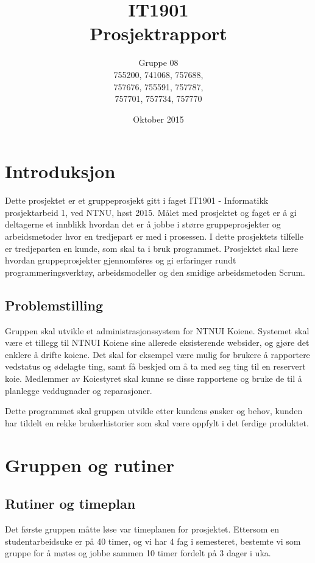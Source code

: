 \documentclass[12pt,a4paper,norsk]{article}
\title{IT1901 \\ Prosjektrapport}
\author{Gruppe 08 \\ 
    755200, 741068, 757688,\\
    757676, 755591, 757787, \\
    757701, 757734, 757770}
\date{Oktober 2015}
\begin{document}
	\maketitle
	\newpage
	\tableofcontents
	\newpage
	\section{Introduksjon}
	

Dette prosjektet er et gruppeprosjekt gitt i faget IT1901 - Informatikk prosjektarbeid 1, ved NTNU, høst 2015. Målet med prosjektet og faget er å gi deltagerne et innblikk hvordan det er å jobbe i større gruppeprosjekter og arbeidsmetoder hvor en tredjepart er med i prosessen. I dette prosjektets tilfelle er tredjeparten en kunde, som skal ta i bruk programmet. Prosjektet skal lære hvordan gruppeprosjekter gjennomføres og gi erfaringer rundt programmeringsverktøy, arbeidsmodeller og den smidige arbeidsmetoden Scrum.\cite[Side 1 - 3 ]{agilemanifesto}

\subsection{Problemstilling}

Gruppen skal utvikle et administrasjonssystem for NTNUI Koiene. Systemet skal være et tillegg til NTNUI Koiene sine allerede eksisterende websider, og gjøre det enklere å drifte koiene. Det skal for eksempel være mulig for brukere å rapportere vedstatus og ødelagte ting, samt få beskjed om å ta med seg ting til en reservert koie. Medlemmer av Koiestyret skal kunne se disse rapportene og bruke de til å planlegge veddugnader og reparasjoner.

Dette programmet skal gruppen utvikle etter kundens ønsker og behov, kunden har tildelt en rekke brukerhistorier som skal være oppfylt i det ferdige produktet.

	\section{Gruppen og rutiner}
	
\subsection{Rutiner og timeplan}

Det første gruppen måtte løse var timeplanen for prosjektet. Ettersom en studentarbeidsuke er på 40 timer, og vi har 4 fag i semesteret, bestemte vi som gruppe for å møtes og jobbe sammen 10 timer fordelt på 3 dager i uka. 
\end{document}

